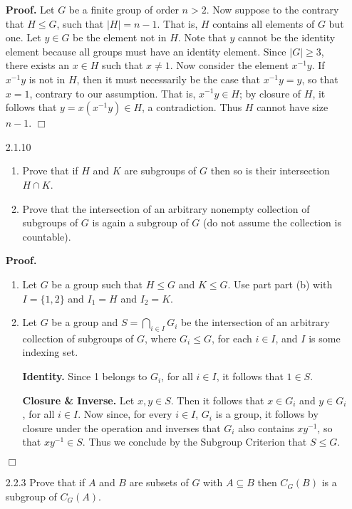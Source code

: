 \documentclass[9pt]{article}
\newcommand{\qed}{\hfill \ensuremath{\Box}}
\newcommand{\D}{\displaystyle}
\begin{document}
\begin{enumerate}
      \textbf{Proof.} Let $G$ be a finite group of order $n > 2$. Now suppose to
      the contrary that $H \le G$, such that $|H| = n - 1$. That is, $H$ contains
      all elements of $G$ but one. Let $y \in G$ be the element not in $H$. Note
      that $y$ cannot be the identity element because all groups must have an
      identity element. Since $|G| \ge 3$, there exists an $x \in H$ such that
      $x \neq 1$. Now consider the element
      $x^{-1}y$. If $x^{-1}y$ is not in $H$, then it must necessarily be the
      case that $x^{-1}y = y$, so that $x = 1$, contrary to our assumption. That
      is, $x^{-1}y \in H$; by closure of $H$, it follows that
      $y = x(x^{-1}y) \in H$, a contradiction. Thus $H$ cannot have size
      $n - 1$. \qed
   \item[2.1.10]  \begin{enumerate}
                     \item Prove that if $H$ and $K$ are subgroups of $G$ then
                           so is their intersection $H \cap K$.
                     \item Prove that the intersection of an arbitrary nonempty
                           collection of subgroups of $G$ is again a subgroup of
                           $G$ (do not assume the collection is countable).
                  \end{enumerate}

      \textbf{Proof.}

      \begin{enumerate}
         \item Let $G$ be a group such that $H \le G$ and $K \le G$. Use part
               part (b) with $I = \{1, 2\}$ and $I_1 = H$ and $I_2 = K$.
         \item Let $G$ be a group and $S = \D\bigcap_{i \in I}G_i$ be the
               intersection of an arbitrary collection of subgroups of $G$,
               where $G_i \le G$, for each $i \in I$, and $I$ is some indexing   
               set.
               
               \textbf{Identity.} Since 1 belongs to $G_i$, for all $i \in I$,
               it follows that $1 \in S$.
               
               \textbf{Closure \& Inverse.} Let $x, y \in S$. Then it follows
               that $x \in G_i$ and $y \in G_i$, for all $i \in I$. Now since,
               for every $i \in I$, $G_i$ is a group, it follows by closure
               under the operation and inverses that $G_i$ also contains
               $xy^{-1}$, so that $xy^{-1} \in S$. Thus we conclude by the
               Subgroup Criterion that $S \le G$.
      \end{enumerate} \qed
   \item[2.2.3]   Prove that if $A$ and $B$ are subsets of $G$ with
                  $A \subseteq B$ then $C_G(B)$ is a subgroup of $C_G(A)$.


\end{enumerate}
\end{document}
